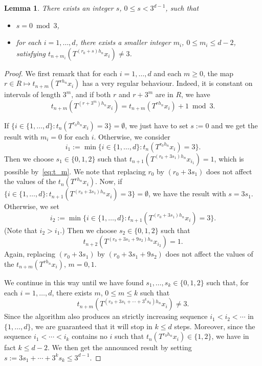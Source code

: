 \documentclass[10pt]{amsart}
\newtheorem{lemm}[theo]{Lemma}\newtheorem{prop}[theo]{Proposition}\newtheorem{coro}[theo]{Corollary}\newtheorem{conj}[theo]{Conjecture}
\theoremstyle{definition}\newtheorem{defi}[theo]{Definition}\newtheorem{rema}[theo]{Remark}\newtheorem{exam}[theo]{Example}\newtheorem{exem}[theo]{Example}\newtheorem{nota}[theo]{Notation}
\newcommand{\egdef}{:=}
\begin{document}
\begin{lemm}\label{lemma:sameS}
There exists an integer $s$, $0\le s<3^{d-1}$, such that
\begin{itemize}
\item $s=0\bmod 3$,
\item for each $i=1,\ldots,d$, there exists a smaller integer $m_i$, $0\le m_i\le d-2$, satisfying $t_{n+m_i}(T^{(r_0+s)h_n}x_i)\neq 3$.
\end{itemize}
\end{lemm}
\begin{proof}
We first remark that for each $i=1,\ldots,d$ and each $m\ge0$, the map $r\in R\mapsto t_{n+m}(T^{rh_n}x_i)$ has a very regular behaviour. Indeed, it is constant on intervals of length $3^m$, and if both $r$ and $r+3^m$ are in $R$, we have
\begin{equation}\label{eq:t_m}
t_{n+m}(T^{(r+3^m)h_n}x_i) = t_{n+m}(T^{rh_n}x_i) + 1 \bmod 3.
\end{equation}

If $\bigl\{i\in\{1,\ldots,d\}:t_n(T^{r_0h_n}x_i)=3\bigr\}=\emptyset$, we just have to set $s\egdef 0$ and we get the result with $m_i=0$ for each $i$. Otherwise, we consider
\[
i_1 \egdef \min \bigl\{i\in\{1,\ldots,d\}:t_n(T^{r_0h_n}x_i)=3 \bigr\}.
\]
Then we choose $s_1\in\{0,1,2\}$ such that $t_{n+1}(T^{(r_0+3s_1)h_n}x_{i_1})=1$, which is possible by~\eqref{eq:t_m}. We note that replacing $r_0$ by $(r_0+3s_1)$ does not affect the values of the $t_n(T^{rh_n}x_i)$. Now, if $\bigl\{i\in\{1,\ldots,d\}:t_{n+1}(T^{(r_0+3s_1)h_n}x_i)=3\bigr\}=\emptyset$, we have the result with $s=3s_1$. Otherwise, we set
\[
i_2 \egdef \min \bigl\{i\in\{1,\ldots,d\}:t_{n+1}(T^{(r_0+3s_1)h_n}x_i)=3 \bigr\}.
\]
(Note that $i_2>i_1$.) Then we choose $s_2\in\{0,1,2\}$ such that
\[
t_{n+2}(T^{(r_0+3s_1+9s_2)h_n}x_{i_2})=1.
\]
Again, replacing $(r_0+3s_1)$ by $(r_0+3s_1+9s_2)$ does not affect the values of the $t_{n+m}(T^{rh_n}x_i)$, $m=0,1$.

We continue in this way until we have found $s_1,\ldots,s_k\in\{0,1,2\}$ such that, for each $i=1,\ldots,d$, there exists $m$, $0\le m\le k$ such that
\[
t_{n+m}(T^{(r_0+3s_1+\cdots+3^ks_k)h_n}x_i)\neq3.
\]
Since the algorithm also produces an strictly increasing sequence $i_1<i_2<\cdots$ in $\{1,\ldots,d\}$, we are guaranteed that it will stop in $k\le d$ steps. Moreover, since the sequence $i_1<\cdots<i_k$ contains no $i$ such that $t_n(T^{r_0h_n}x_i)\in\{1,2\}$, we have in fact $k\le d-2$. We then get the announced result by setting $s\egdef 3s_1+\cdots+3^ks_k\le 3^{d-1}$.
\end{proof}
\end{document}
